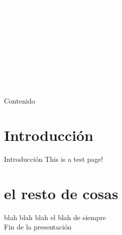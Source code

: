 \documentclass[12pt,spanish]{beamer}
\begin{document}
{
\begin{frame}
    \begin{minipage}[t]{0.8\linewidth} %
{\Huge \textcolor{white}{Aquí va el Título}} %
\\
\\
{ \textcolor{white}{Nombre del autor}} %
\\
{ \textcolor{white}{correo@correo.com}}
\\
\\
{ \textcolor{white}{Nombre del autor 2}} %
\\
{ \textcolor{white}{correo2@correo.com}}
\\

{ \textcolor{white}{Nombre del autor 3}} %
\\
{ \textcolor{white}{correo3@correo.com}}

\end{minipage}
\end{frame}
}


\begin{frame}{Contenido}
\tableofcontents
\end{frame}


\section{Introducción}
\begin{frame}{Introducción}
  This is a test page!
\end{frame}

\section{el resto de cosas}

\begin{frame}{blah blah blah}
  el blah de siempre
\\  
  Fin de la presentación
\end{frame}
\end{document}

